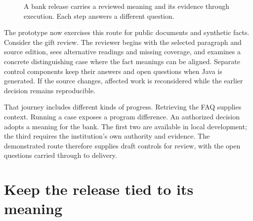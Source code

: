 \documentclass[12pt,a4paper,oneside,openany]{book}
\begin{document}
\begin{figure}[htbp]
\centering
{}
\caption{A bank release carries a reviewed meaning and its evidence through
execution. Each step answers a different question.}
\label{fig:reader-implementation-route}
\end{figure}

The prototype now exercises this route for public documents and synthetic facts.
Consider the gift review. The reviewer begins with the selected paragraph and
source edition, sees alternative readings and missing coverage, and examines a
concrete distinguishing case where the fact meanings can be aligned. Separate
control components keep their answers and open questions when Java is generated.
If the source changes, affected work is reconsidered while the earlier decision
remains reproducible.

That journey includes different kinds of progress. Retrieving the FAQ supplies
context. Running a case exposes a program difference. An authorized decision
adopts a meaning for the bank. The first two are available in local development;
the third requires the institution's own authority and evidence. The demonstrated
route therefore supplies draft controls for review, with the open questions
carried through to delivery.

\section{Keep the release tied to its meaning}
\end{document}
